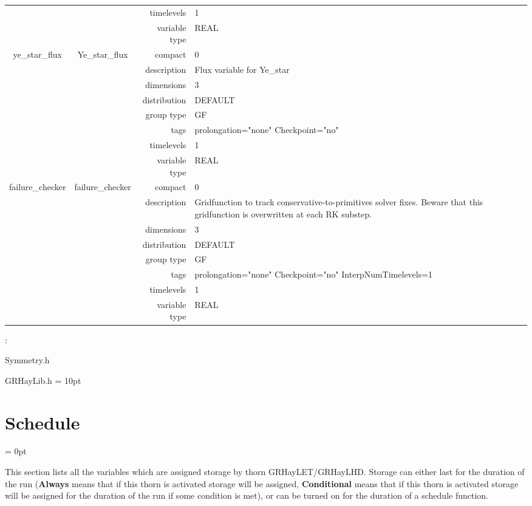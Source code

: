 \documentclass{article}
\begin{document}
\begin{tabular*}{150mm}{|c|c@{\extracolsep{\fill}}|rl|}
 &  & timelevels & 1 \\ 
 &  & variable type & REAL \\ 
\hline 
ye\_star\_flux & Ye\_star\_flux & compact & 0 \\ 
 &  & description & Flux variable for Ye\_star \\ 
 &  & dimensions & 3 \\ 
 &  & distribution & DEFAULT \\ 
 &  & group type & GF \\ 
 &  & tags & prolongation="none" Checkpoint="no" \\ 
 &  & timelevels & 1 \\ 
 &  & variable type & REAL \\ 
\hline 
failure\_checker & failure\_checker & compact & 0 \\ 
 &  & description & Gridfunction to track conservative-to-primitives solver fixes. Beware that this gridfunction is overwritten at each RK substep. \\ 
 &  & dimensions & 3 \\ 
 &  & distribution & DEFAULT \\ 
 &  & group type & GF \\ 
 &  & tags & prolongation="none" Checkpoint="no" InterpNumTimelevels=1 \\ 
 &  & timelevels & 1 \\ 
 &  & variable type & REAL \\ 
\hline 
\end{tabular*} 



\vspace{5mm}

: 

Symmetry.h

GRHayLib.h
\vspace{2mm}\parskip = 10pt 

\section{Schedule} 


\parskip = 0pt


\noindent This section lists all the variables which are assigned storage by thorn GRHayLET/GRHayLHD.  Storage can either last for the duration of the run ({\bf Always} means that if this thorn is activated storage will be assigned, {\bf Conditional} means that if this thorn is activated storage will be assigned for the duration of the run if some condition is met), or can be turned on for the duration of a schedule function.
\end{document}
